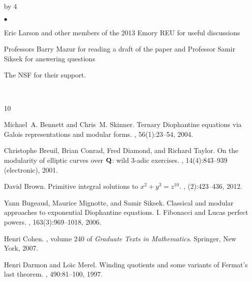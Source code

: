 \documentclass[12pt]{scrartcl}
\newenvironment{citemize}{
\begin{list}{$\bullet$}{\setlength{\itemsep}{0pt} \setlength{\rightmargin}{0pt} \setlength{\leftmargin}{0.5\labelwidth} \setlength{\topsep}{0pt}}
}{\end{list}}
\def\anzspalten{4}
\newlength{\kastenwidth}
\newenvironment{kasten}{%
  \begin{lrbox}{\dummybox}%
    \begin{minipage}{0.96\linewidth}}%
    {\end{minipage}%
  \end{lrbox}%
  \raisebox{-\depth}{\psshadowbox[framesep=1em]{\usebox{\dummybox}}}\\[0.5em]}
\newenvironment{spalte}{%
  \setlength\kastenwidth{1.2\textwidth}
  \divide\kastenwidth by \anzspalten
  \begin{minipage}[t]{\kastenwidth}}{\end{minipage}\hfill}
\begin{document}
\begin{lrbox}{\spalten}
{\begin{spalte}
\begin{kasten}
\begin{citemize}
\item Eric Larson and other members of the 2013 Emory REU for useful discussions

\item Professors Barry Mazur for reading a draft of the paper and Professor Samir Siksek for answering questions

\item The NSF for their support.
\end{citemize}
\end{kasten}

\begin{kasten}
         {\small

\begin{thebibliography}{10}


Michael~A. Bennett and Chris~M. Skinner.
\newblock Ternary {D}iophantine equations via {G}alois representations and
  modular forms.
, 56(1):23--54, 2004.

Christophe Breuil, Brian Conrad, Fred Diamond, and Richard Taylor.
\newblock On the modularity of elliptic curves over {$\bold Q$}: wild 3-adic
  exercises.
, 14(4):843--939 (electronic), 2001.

David Brown.
\newblock Primitive integral solutions to {$x^2+y^3=z^{10}$}.
, (2):423--436, 2012.


Yann Bugeaud, Maurice Mignotte, and Samir Siksek.
\newblock Classical and modular approaches to exponential {D}iophantine
  equations. {I}. {F}ibonacci and {L}ucas perfect powers.
, 163(3):969--1018, 2006.

Henri Cohen.
, volume
  240 of {\em Graduate Texts in Mathematics}.
\newblock Springer, New York, 2007.

Henri Darmon and Lo{\"{\i}}c Merel.
\newblock Winding quotients and some variants of {F}ermat's last theorem.
, 490:81--100, 1997.


\end{thebibliography}}
\end{kasten}
\end{spalte}}
\end{lrbox}
\end{document}
